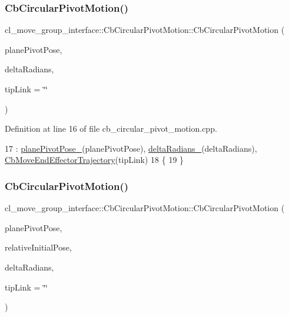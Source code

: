 \subsubsection{\texorpdfstring{Cb\+Circular\+Pivot\+Motion()}{CbCircularPivotMotion()}\hspace{0.1cm}{\footnotesize\ttfamily [2/3]}}
{\footnotesize\ttfamily cl\+\_\+move\+\_\+group\+\_\+interface\+::\+Cb\+Circular\+Pivot\+Motion\+::\+Cb\+Circular\+Pivot\+Motion (\begin{DoxyParamCaption}\item[{const geometry\+\_\+msgs\+::\+Pose\+Stamped \&}]{plane\+Pivot\+Pose,  }\item[{double}]{delta\+Radians,  }\item[{std\+::string}]{tip\+Link = {\ttfamily \char`\"{}\char`\"{}} }\end{DoxyParamCaption})}



Definition at line 16 of file cb\+\_\+circular\+\_\+pivot\+\_\+motion.\+cpp.


\begin{DoxyCode}
17         : \hyperlink{classcl__move__group__interface_1_1CbCircularPivotMotion_a0994efbe93b9f9a61fcf3703c360cda2}{planePivotPose\_}(planePivotPose), \hyperlink{classcl__move__group__interface_1_1CbCircularPivotMotion_afade33f1182615c64ea972075bfd2b95}{deltaRadians\_}(deltaRadians), 
      \hyperlink{classcl__move__group__interface_1_1CbMoveEndEffectorTrajectory_af7e718b0c53e912fd74968abbb0a4810}{CbMoveEndEffectorTrajectory}(tipLink)
18     \{
19     \}
\end{DoxyCode}
\mbox{\label{classcl__move__group__interface_1_1CbCircularPivotMotion_ae2035c601c6eb32950dc1aba2aff5f3a}} 
\subsubsection{\texorpdfstring{Cb\+Circular\+Pivot\+Motion()}{CbCircularPivotMotion()}\hspace{0.1cm}{\footnotesize\ttfamily [3/3]}}
{\footnotesize\ttfamily cl\+\_\+move\+\_\+group\+\_\+interface\+::\+Cb\+Circular\+Pivot\+Motion\+::\+Cb\+Circular\+Pivot\+Motion (\begin{DoxyParamCaption}\item[{const geometry\+\_\+msgs\+::\+Pose\+Stamped \&}]{plane\+Pivot\+Pose,  }\item[{const geometry\+\_\+msgs\+::\+Pose \&}]{relative\+Initial\+Pose,  }\item[{double}]{delta\+Radians,  }\item[{std\+::string}]{tip\+Link = {\ttfamily \char`\"{}\char`\"{}} }\end{DoxyParamCaption})}




